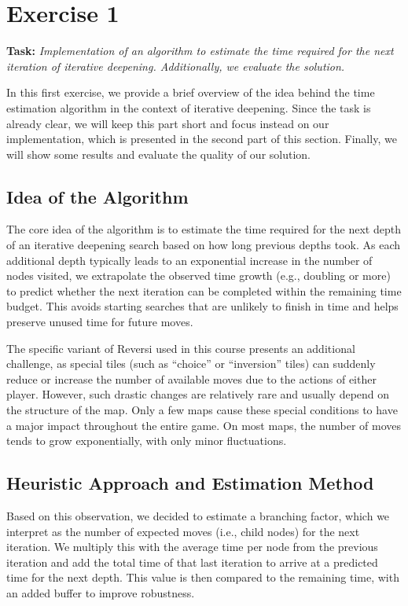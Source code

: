 \section*{Exercise 1}

\textbf{Task:} \textit{Implementation of an algorithm to estimate the time required for the next iteration of iterative deepening. Additionally, we evaluate the solution.}

\noindent In this first exercise, we provide a brief overview of the idea behind the time estimation algorithm in the context of iterative deepening. Since the task is already clear, we will keep this part short and focus instead on our implementation, which is presented in the second part of this section. Finally, we will show some results and evaluate the quality of our solution.

\subsection*{Idea of the Algorithm}

\noindent The core idea of the algorithm is to estimate the time required for the next depth of an iterative deepening search based on how long previous depths took. As each additional depth typically leads to an exponential increase in the number of nodes visited, we extrapolate the observed time growth (e.g., doubling or more) to predict whether the next iteration can be completed within the remaining time budget. This avoids starting searches that are unlikely to finish in time and helps preserve unused time for future moves.

\noindent The specific variant of Reversi used in this course presents an additional challenge, as special tiles (such as “choice” or “inversion” tiles) can suddenly reduce or increase the number of available moves due to the actions of either player. However, such drastic changes are relatively rare and usually depend on the structure of the map. Only a few maps cause these special conditions to have a major impact throughout the entire game. On most maps, the number of moves tends to grow exponentially, with only minor fluctuations.

\subsection*{Heuristic Approach and Estimation Method}

\noindent Based on this observation, we decided to estimate a branching factor, which we interpret as the number of expected moves (i.e., child nodes) for the next iteration. We multiply this with the average time per node from the previous iteration and add the total time of that last iteration to arrive at a predicted time for the next depth. This value is then compared to the remaining time, with an added buffer to improve robustness.

